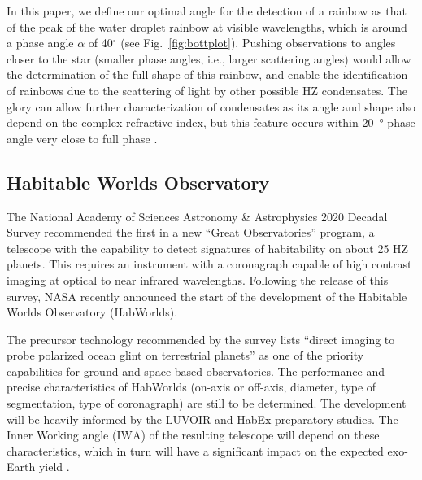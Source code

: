 \documentclass[
    usenatbib,
]{mnras}
\newcommand{\IWA}{\ensuremath{\mathrm{IWA}}}
\newcommand{\hwo}{HabWorlds}
\begin{document}
In this paper, we define our optimal angle for the detection of a rainbow as that of the peak of the water droplet rainbow at visible wavelengths, which is around a phase angle $\alpha$ of 40$^\circ$ (see Fig.~\ref{fig:bottplot}).
%
Pushing observations to angles closer to the star (smaller phase angles, i.e., larger scattering angles) would allow the determination of the full shape of this rainbow, and enable the identification of rainbows due to the scattering of light by other possible HZ condensates.
%
The glory 
can allow further characterization of condensates as its angle and shape also depend on the complex refractive index, but this feature occurs within \qty{20}{\degree} phase angle very close to full phase \citep{hansentravis1974}.
%

\subsection{Habitable Worlds Observatory}

The National Academy of Sciences Astronomy \& Astrophysics 2020 Decadal Survey \citep{decadal} recommended the first in a new \enquote{Great Observatories} program, a telescope with the capability to detect signatures of habitability on about 25 HZ planets.
%
This requires an instrument with a coronagraph capable of high contrast imaging at optical to near infrared wavelengths.
%
Following the release of this survey, NASA recently announced the start of the development of the Habitable Worlds Observatory (\hwo).
%

The precursor technology recommended by the survey lists \enquote{direct imaging to probe polarized ocean glint on terrestrial planets} as one of the priority capabilities \citep[Box E.1 in][]{decadal} for ground and space-based observatories.
%
The performance and precise characteristics of \hwo{} (on-axis or off-axis, diameter, type of segmentation, type of coronagraph) are still to be determined.
%
The development will be heavily informed by the LUVOIR \citep{LUVOIR2019} and HabEx \citep{HabEx_2020} preparatory studies.
%
The Inner Working angle (\IWA{}) of the resulting telescope will depend on these characteristics, which in turn will have a significant impact on the expected exo-Earth yield \citep{Stark2019_exoplanetyield}.
\end{document}
